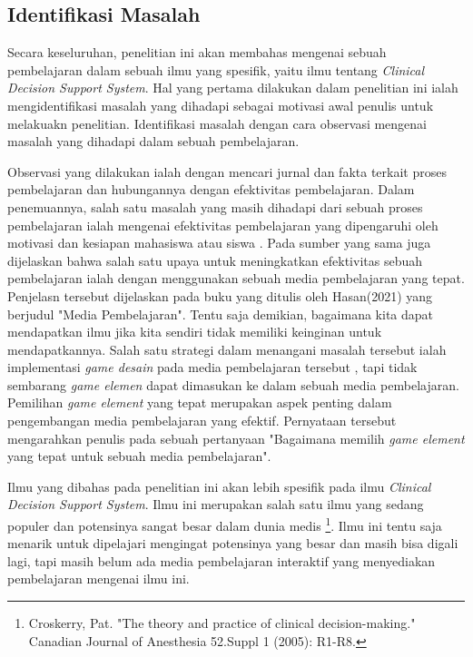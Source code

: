 \subsection{Identifikasi Masalah}
Secara keseluruhan, penelitian ini akan membahas mengenai sebuah pembelajaran dalam sebuah ilmu yang spesifik, yaitu ilmu tentang \textit{Clinical Decision Support System}.
Hal yang pertama dilakukan dalam penelitian ini ialah mengidentifikasi masalah yang dihadapi sebagai motivasi awal penulis untuk melakuakn penelitian.
Identifikasi masalah dengan cara observasi mengenai masalah yang dihadapi dalam sebuah pembelajaran. 	

Observasi yang dilakukan ialah dengan mencari jurnal dan fakta terkait proses pembelajaran dan hubungannya dengan efektivitas pembelajaran.
Dalam penemuannya, salah satu masalah yang masih dihadapi dari sebuah proses pembelajaran ialah mengenai efektivitas pembelajaran yang dipengaruhi oleh motivasi dan kesiapan mahasiswa atau siswa \cite{hasan2021media}.
Pada sumber yang sama juga dijelaskan bahwa salah satu upaya untuk meningkatkan efektivitas sebuah pembelajaran ialah dengan menggunakan sebuah media pembelajaran yang tepat.
Penjelasn tersebut dijelaskan pada buku yang ditulis oleh Hasan(2021) yang berjudul "Media Pembelajaran"\cite{hasan2021media}.
Tentu saja demikian, bagaimana kita dapat mendapatkan ilmu jika kita sendiri tidak memiliki keinginan untuk mendapatkannya.
Salah satu strategi dalam menangani masalah tersebut ialah implementasi \textit{game desain} pada media pembelajaran tersebut \cite{EnjoyLearningLikeGaming}, tapi tidak sembarang \textit{game elemen} dapat dimasukan ke dalam sebuah media pembelajaran.
Pemilihan \textit{game element} yang tepat merupakan aspek penting dalam pengembangan media pembelajaran yang efektif\cite{kapp2012gamification}. Pernyataan tersebut mengarahkan penulis pada sebuah pertanyaan "Bagaimana memilih \textit{game element} yang tepat untuk sebuah media pembelajaran".

Ilmu yang dibahas pada penelitian ini akan lebih spesifik pada ilmu \textit{Clinical Decision Support System}. Ilmu ini merupakan salah satu ilmu yang sedang populer dan potensinya sangat besar dalam dunia medis \footnote[1]{Croskerry, Pat. "The theory and practice of clinical decision-making." Canadian Journal of Anesthesia 52.Suppl 1 (2005): R1-R8.}.
Ilmu ini tentu saja menarik untuk dipelajari mengingat potensinya yang besar dan masih bisa digali lagi, tapi masih belum ada media pembelajaran interaktif yang menyediakan pembelajaran mengenai ilmu ini.

